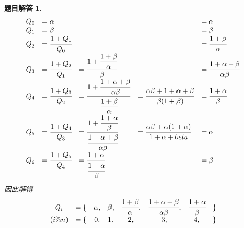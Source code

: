 \documentclass[mode=geye]{elegantnote}
\newtheorem{answer}{题目解答}
\begin{document}
\begin{answer}
	\begin{equation*}
		\begin{array}{lllll}
			Q_0 &= \alpha & & &= \alpha\\
			Q_1 &= \beta  & & &= \beta\\
			Q_2 &= \cfrac{1+Q_1}{Q_0} & &&= \cfrac{1+\beta}{\alpha} \\
			Q_3 &= \cfrac{1+Q_2}{Q_1} &= \cfrac{1+\cfrac{1+\beta}{\alpha}}{\beta} 
			&&= \cfrac{1+\alpha+\beta}{\alpha\beta} \\
			Q_4 &= \cfrac{1+Q_3}{Q_2} 
			&= \cfrac{1+\cfrac{1+\alpha+\beta}{\alpha\beta} }{\cfrac{1+\beta}{\alpha}}
			&= \cfrac{\alpha\beta+1+\alpha+\beta}{\beta(1+\beta)} 
			&= \cfrac{1+\alpha}{\beta} \\
			Q_5 &= \cfrac{1+Q_4}{Q_3} 
			&= \cfrac{1+\cfrac{1+\alpha}{\beta}}{ \cfrac{1+\alpha+\beta}{\alpha\beta}}
			&= \cfrac{\alpha\beta+\alpha(1+\alpha)}{1+\alpha+beta} &= \alpha \\
			Q_6 &= \cfrac{1+Q_5}{Q_4} &= \cfrac{1+\alpha}{\cfrac{1+\alpha}{\beta}} & &= \beta\\
		\end{array}
	\end{equation*}
	因此解得 
	\begin{equation*}
		\begin{array}{clcccccc}
			Q_i &= \{ &\alpha ,& \beta ,& \cfrac{1+\beta}{\alpha} ,& \cfrac{1+\alpha+\beta}{\alpha\beta} ,& \cfrac{1+\alpha}{\beta} & \}\\
			(i\%n) &= \{ & 0 ,& 1 ,& 2 ,& 3 ,& 4 ,& \}\\
		\end{array}
	\end{equation*}
\end{answer}	
\end{document}
